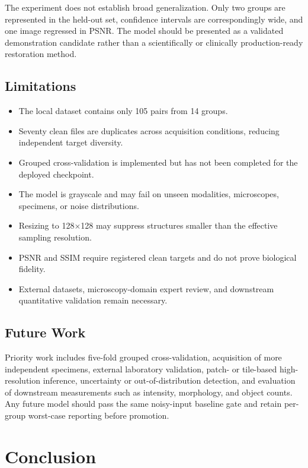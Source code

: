 \documentclass[12pt,a4paper]{report}
\begin{document}
The experiment does not establish broad generalization. Only two groups are represented in the held-out set, confidence intervals are correspondingly wide, and one image regressed in PSNR. The model should be presented as a validated demonstration candidate rather than a scientifically or clinically production-ready restoration method.

\section{Limitations}

\begin{itemize}
    \item The local dataset contains only 105 pairs from 14 groups.
    \item Seventy clean files are duplicates across acquisition conditions, reducing independent target diversity.
    \item Grouped cross-validation is implemented but has not been completed for the deployed checkpoint.
    \item The model is grayscale and may fail on unseen modalities, microscopes, specimens, or noise distributions.
    \item Resizing to 128$\times$128 may suppress structures smaller than the effective sampling resolution.
    \item PSNR and SSIM require registered clean targets and do not prove biological fidelity.
    \item External datasets, microscopy-domain expert review, and downstream quantitative validation remain necessary.
\end{itemize}

\section{Future Work}

Priority work includes five-fold grouped cross-validation, acquisition of more independent specimens, external laboratory validation, patch- or tile-based high-resolution inference, uncertainty or out-of-distribution detection, and evaluation of downstream measurements such as intensity, morphology, and object counts. Any future model should pass the same noisy-input baseline gate and retain per-group worst-case reporting before promotion.

\chapter{Conclusion}
\label{chap:validated_conclusion}
\end{document}
